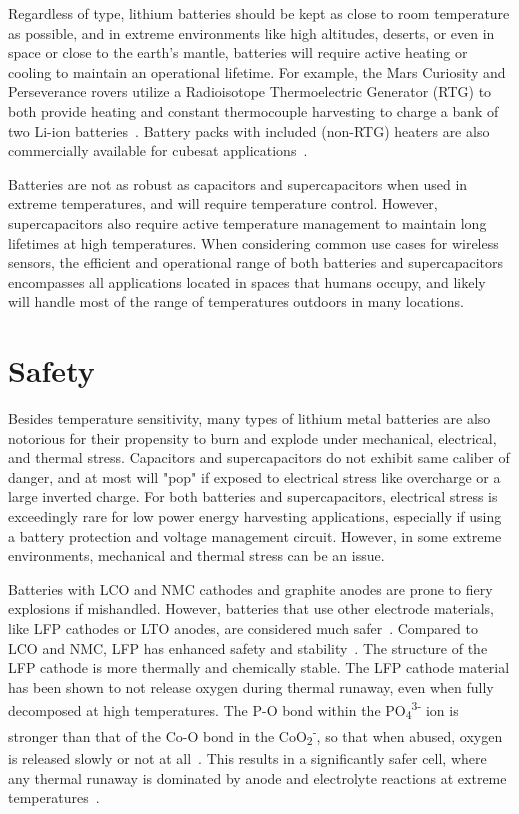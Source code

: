 Regardless of type, lithium batteries should be kept as close to room temperature as possible, and in extreme environments like high altitudes, deserts, or even in space or close to the earth's mantle, batteries will require active heating or cooling to maintain an operational lifetime. For example, the Mars Curiosity and Perseverance rovers utilize a Radioisotope Thermoelectric Generator (RTG) to both provide heating and constant thermocouple harvesting to charge a bank of two Li-ion batteries~\cite{nasaPerseverance}. Battery packs with included (non-RTG) heaters are also commercially available for cubesat applications~\cite{nanopowerbpx}.

Batteries are not as robust as capacitors and supercapacitors when used in extreme temperatures, and will require temperature control. However, 
supercapacitors also require active temperature management to maintain long lifetimes at high temperatures. When considering common use cases for wireless sensors, the efficient and operational range of both batteries and supercapacitors encompasses all applications located in spaces that humans occupy, and likely will handle most of the range of temperatures outdoors in many locations.

\section{Safety} 
Besides temperature sensitivity, many types of lithium metal batteries are also notorious for their propensity to burn and explode under mechanical, electrical, and thermal stress.
Capacitors and supercapacitors do not exhibit same caliber of danger, and at most will "pop" if exposed to electrical stress like overcharge or a large inverted charge. 
For both batteries and supercapacitors, electrical stress is exceedingly rare for low power energy harvesting applications, especially if using a battery protection and voltage management circuit. However, in some extreme environments, mechanical and thermal stress can be an issue. 

Batteries with LCO and NMC cathodes and graphite anodes are prone to fiery explosions if mishandled. However, 
batteries that use other electrode materials, like LFP cathodes or LTO anodes, are considered much safer~\cite{doughty2012general,nitta2015li,belharouakElectrochemistry11,larssonAbuse14}.
Compared to LCO and NMC, LFP has enhanced safety and stability~\cite{larssonAbuse14}. The structure of the LFP cathode is more thermally and chemically stable.  
The LFP cathode material has been shown to not release oxygen during thermal runaway, even when fully decomposed at high temperatures. 
The P-O bond within the PO\textsubscript{4}\textsuperscript{3-} ion is stronger than that of the Co-O bond in the CoO\textsubscript{2}\textsuperscript{-}, so that when abused, oxygen is released slowly or not at all~\cite{nitta2015li}.
This results in a significantly safer cell, where any thermal runaway is dominated by anode and electrolyte reactions at extreme temperatures~\cite{doughty2012general}.

